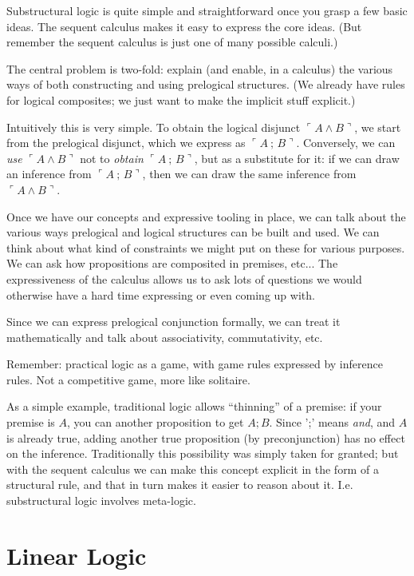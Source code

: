 \documentclass{article}
\begin{document}
Substructural logic is quite simple and straightforward once you grasp
a few basic ideas. The sequent calculus makes it easy to express the
core ideas. (But remember the sequent calculus is just one of many
possible calculi.)

The central problem is two-fold: explain (and enable, in a calculus)
the various ways of both constructing and using prelogical structures.
(We already have rules for logical composites; we just want to make
the implicit stuff explicit.)

Intuitively this is very simple. To obtain the logical disjunct
\(\ulcorner A\land B\urcorner\), we start from the prelogical
disjunct, which we express as \(\ulcorner A\ ;\, B\urcorner\).
Conversely, we can \textit{use} \(\ulcorner A\land B\urcorner\) not to
\textit{obtain} \(\ulcorner A\ ;\, B\urcorner\), but as a substitute
for it: if we can draw an inference from \(\ulcorner A\ ;\,
B\urcorner\), then we can draw the same inference from \(\ulcorner
A\land B\urcorner\).

Once we have our concepts and expressive tooling in place, we can talk
about the various ways prelogical and logical structures can be built
and used. We can think about what kind of constraints we might put on
these for various purposes. We can ask how propositions are composited
in premises, etc... The expressiveness of the calculus allows us to
ask lots of questions we would otherwise have a hard time expressing
or even coming up with.

Since we can express prelogical conjunction formally, we can treat it
mathematically and talk about associativity, commutativity, etc.

Remember: practical logic as a game, with game rules expressed by inference
rules. Not a competitive game, more like solitaire.

As a simple example, traditional logic allows ``thinning''
of a premise: if your premise is \(A\), you can another proposition to
get \(A; B\). Since ';' means \textit{and}, and \(A\) is already true,
adding another true proposition (by preconjunction) has no effect on
the inference. Traditionally this possibility was simply taken for
granted; but with the sequent calculus we can make this concept
explicit in the form of a structural rule, and that in turn makes it
easier to reason about it.  I.e. substructural logic involves meta-logic.

\section{Linear Logic}
\end{document}
